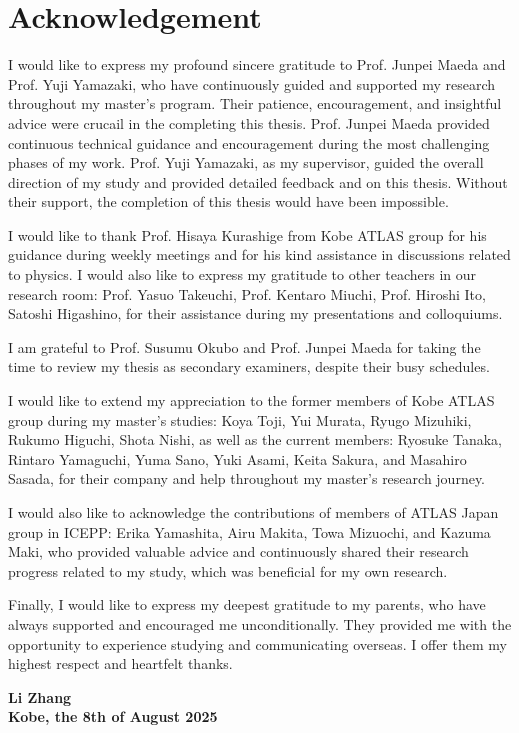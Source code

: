 \chapter*{Acknowledgement}
\markboth{}{} %
I would like to express my profound sincere gratitude to Prof. Junpei Maeda and Prof. Yuji Yamazaki, who have continuously guided and supported my research throughout my master’s program. Their patience, encouragement, and insightful advice were crucail in the completing this thesis. Prof. Junpei Maeda provided continuous technical guidance and encouragement during the most challenging phases of my work. Prof. Yuji Yamazaki, as my supervisor, guided the overall direction of my study and provided detailed feedback and on this thesis. Without their support, the completion of this thesis would have been impossible.

I would like to thank Prof. Hisaya Kurashige from Kobe ATLAS group for his guidance during weekly meetings and for his kind assistance in discussions related to physics. I would also like to express my gratitude to other teachers in our research room: Prof. Yasuo Takeuchi, Prof. Kentaro Miuchi, Prof. Hiroshi Ito, Satoshi Higashino, for their assistance during my presentations and colloquiums.

I am grateful to Prof. Susumu Okubo and Prof. Junpei Maeda for taking the time to review my thesis as secondary examiners, despite their busy schedules.

I would like to extend my appreciation to the former members of Kobe ATLAS group during my master’s studies: Koya Toji, Yui Murata, Ryugo Mizuhiki, Rukumo Higuchi, Shota Nishi, as well as the current members: Ryosuke Tanaka, Rintaro Yamaguchi, Yuma Sano, Yuki Asami, Keita Sakura, and Masahiro Sasada, for their company and help throughout my master’s research journey.

I would also like to acknowledge the contributions of members of ATLAS Japan group in ICEPP: Erika Yamashita, Airu Makita, Towa Mizuochi, and Kazuma Maki, who provided valuable advice and continuously shared their research progress related to my study, which was beneficial for my own research.

Finally, I would like to express my deepest gratitude to my parents, who have always supported and encouraged me unconditionally. They provided me with the opportunity to experience studying and communicating overseas. I offer them my highest respect and heartfelt thanks.

\par\bigskip
\par\bigskip

\begin{flushright}
\par\bigskip
\textbf{Li Zhang}\\
\textbf{Kobe, the 8th of August 2025}
\end{flushright}

